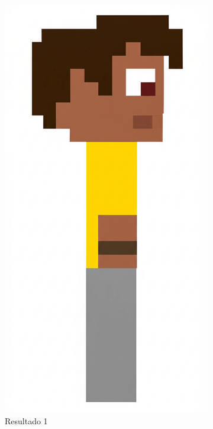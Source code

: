 \begin{figure}[htbp]
\begin{subfigure}{0.23\linewidth}
        \includegraphics[width=1\linewidth]{figs/geminiPro/chat2/res1_tela2.png}
        \caption{\small Resultado 1}
        \label{fig:geminiPro5a}
    \end{subfigure}
    \begin{subfigure}{0.23\linewidth}

\end{subfigure}
\end{figure}
